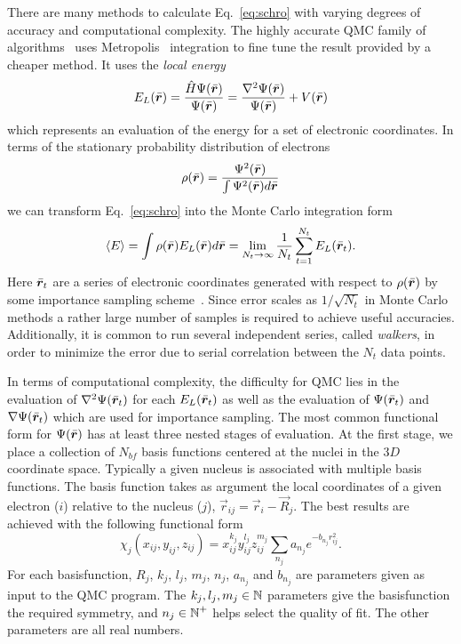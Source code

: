 \documentclass[11pt]{article}
\begin{document}
There are many methods to calculate
Eq.~\eqref{eq:schro} with varying degrees of accuracy and
computational complexity. The highly accurate QMC family of
algorithms~\cite{ReynoldsCeperleyAlder1982} uses
Metropolis~\cite{Metropolis} integration to fine tune the result
provided by a cheaper method. It uses the \emph{local energy}
\begin{equation} \label{eq:elocal}
E_L (\bar{\bm r}) = \frac{\hat{H} \Psi(\bar{\bm r})}{\Psi(\bar{\bm r})} =
\frac{\nabla^2 \Psi(\bar{\bm r})}{\Psi(\bar{\bm r})}
+ V(\bar{\bm r})
\end{equation}
which represents an evaluation of the energy for a set of electronic
coordinates. In terms of the stationary probability distribution of
electrons
\begin{equation} \label{eq:distribution}
\rho(\bar{\bm r}) = \frac{\Psi^2(\bar{\bm r})}{  \int \Psi^2(\bar{\bm r}) d\bar{\bm r} }
\end{equation}
we can transform Eq.~\eqref{eq:schro} into the Monte Carlo integration
form
\begin{equation} \label{eq:montecarlo}
\left< E \right> = \int \rho(\bar{\bm r}) E_L(\bar{\bm r}) d\bar{\bm r}
= \lim_{N_t \to \infty} \frac{1}{N_t} \sum_{t=1}^{N_t} E_L(\bar{\bm r}_t).
\end{equation}
Here $\bar{\bm r}_t$ are a series of electronic coordinates generated with
respect to $\rho(\bar{\bm r})$ by some importance sampling
scheme~\cite{UmrigarNightingaleRunge1993}.
Since error scales as $1/\sqrt{N_t}$ in Monte Carlo methods a rather
large number of samples is required to achieve useful accuracies.
Additionally, it is common to run several independent series, called
\emph{walkers}, in order to minimize the error due to serial correlation
between the $N_t$ data points.

In terms of computational complexity, the difficulty for QMC lies in
the evaluation of $\nabla^2 \Psi(\bar{\bm r}_t)$ for each $E_L(\bar{\bm r}_t)$ as
well as the evaluation of $\Psi(\bar{\bm r}_t)$ and $\nabla \Psi(\bar{\bm r}_t)$
which are used for importance sampling.  The most common functional
form for $\Psi(\bar{\bm r})$ has at least three nested stages of evaluation.
At the first stage, we place a collection of $N_{bf}$ basis functions
centered at the nuclei in the $3D$ coordinate space. Typically a given
nucleus is associated with multiple basis functions. The basis function
takes as argument the local coordinates of a given electron ($i$) relative
to the nucleus ($j$), $\vec{r}_{ij} =\vec{r}_i - \vec{R}_j$. The best
results are achieved with the following functional form
\begin{equation} \label{eq:basisf}
\chi_{j} (x_{ij},y_{ij},z_{ij}) = x^{k_j}_{ij} y^{l_j}_{ij} z^{m_j}_{ij}
\sum_{n_j} a_{n_j} e^{-b_{n_j} r^2_{ij}}.
\end{equation}
For each basisfunction, $R_j$, $k_j$, $l_j$, $m_j$, $n_j$, $a_{n_j}$
and $b_{n_j}$ are parameters given as input to the QMC program. The
$k_j, l_j, m_j \in \mbox{$\mathbb N$}$ parameters give the basisfunction the required
symmetry, and $n_j \in \mbox{$\mathbb N$}^{+}$ helps select the quality of fit. The
other parameters are all real numbers.
\end{document}
